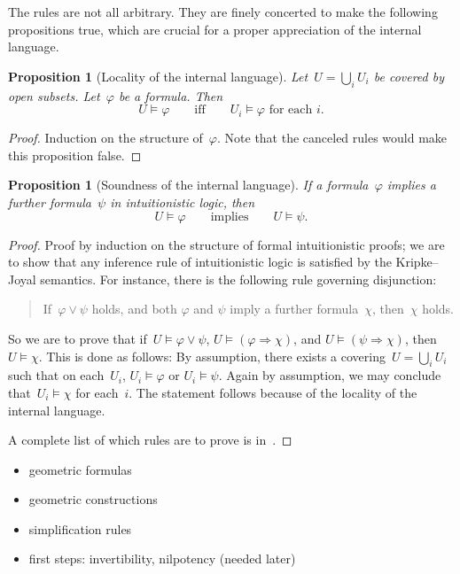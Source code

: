 \documentclass[10pt]{amsart}
\theoremstyle{definition}
\theoremstyle{plain}
\newtheorem{prop}[defn]{Proposition}
\theoremstyle{remark}
\newcommand{\?}{\,{:}\,}
\renewcommand{\_}{\mathpunct{.}\,}
\begin{document}
The rules are not all arbitrary. They are finely concerted to make the
following propositions true, which are crucial for a proper appreciation of the
internal language.

\begin{prop}[Locality of the internal language]
Let~$U = \bigcup_i U_i$ be covered by open subsets. Let~$\varphi$
be a formula. Then
\[ U \models \varphi \qquad\text{iff}\qquad
  \text{$U_i \models \varphi$ for each $i$}. \]
\end{prop}
\begin{proof}Induction on the structure of~$\varphi$. Note that the canceled
rules would make this proposition false.\end{proof}

\begin{prop}[Soundness of the internal language]
If a formula~$\varphi$ implies a further formula~$\psi$ in intuitionistic logic, then
\[ U \models \varphi \qquad\text{implies}\qquad
  U \models \psi. \]
\end{prop}
\begin{proof}
Proof by induction on the structure of formal intuitionistic proofs; we are to
show that any inference rule of intuitionistic logic is satisfied by the
Kripke--Joyal semantics. For instance, there is the following rule governing
disjunction:
\begin{quote}
If~$\varphi \vee \psi$ holds, and both $\varphi$ and $\psi$ imply a further
formula~$\chi$, then~$\chi$ holds.
\end{quote}
So we are to prove that if~$U \models \varphi \vee \psi$, $U \models (\varphi
\Rightarrow \chi)$, and $U \models (\psi \Rightarrow \chi)$, then $U \models \chi$.
This is done as follows: By assumption, there exists a covering~$U = \bigcup_i
U_i$ such that on each~$U_i$, $U_i \models \varphi$ or $U_i \models \psi$.
Again by assumption, we may conclude that~$U_i \models \chi$ for each~$i$. The statement
follows because of the locality of the internal language.

A complete list of which rules are to prove is
in~\cite[D1.3.1]{johnstone:elephant}.
\end{proof}

\begin{itemize}
\item geometric formulas
\item geometric constructions
\item simplification rules
\item first steps: invertibility, nilpotency (needed later)
\end{itemize}
\end{document}
